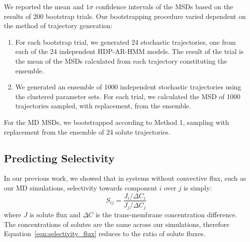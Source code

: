 \documentclass[journal=jpcbfk,manuscript=article]{achemso}
\begin{document}
  We reported the mean and $1 \sigma$ confidence intervals of the MSDs based on the 
  results of 200 bootstrap trials. Our bootstrapping procedure varied dependent on the
  method of trajectory generation:
  \begin{enumerate}[label={Method \theenumi :}, leftmargin=3.5\parindent]
  	\item For each bootstrap trial, we generated 24 stochastic trajectories, one from
  	each of the 24 independent HDP-AR-HMM models. The result of the trial is the mean
  	of the MSDs calculated from each trajectory constituting the ensemble. 
    \item We generated an ensemble of 1000 independent stochastic trajectories using
    the clustered parameter sets. For each trial, we calculated the MSD of 1000 
    trajectories sampled, with replacement, from the ensemble.
  \end{enumerate}

  For the MD MSDs, we bootstrapped according to Method 1, sampling with 
  replacement from the ensemble of 24 solute trajectories.
  
  \subsection{Predicting Selectivity}\label{method:selectivity}
  
  In our previous work, we showed that in systems without convective flux, such
  as our MD simulations, selectivity towards component $i$ over $j$ is simply:
  \begin{equation}
  S_{ij} = \frac{J_i / \Delta C_i}{J_j / \Delta C_j}
  \label{eqn:selectivity_flux}
  \end{equation}
  where $J$ is solute flux and $\Delta C$ is the trans-membrane concentration
  difference.~\cite{coscia_capturing_2020} The concentrations of solutes are the
  same across our simulations, therefore Equation~\ref{eqn:selectivity_flux} 
  reduces to the ratio of solute fluxes. 
  
\end{document}
